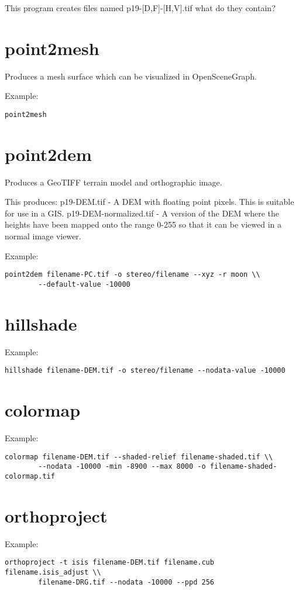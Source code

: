 This program creates files named p19-[D,F]-[H,V].tif what do they contain?

\section{point2mesh}
\label{point2mesh}

Produces a mesh surface which can be visualized in OpenSceneGraph.

Example:
\begin{verbatim}
point2mesh
\end{verbatim}

\section{point2dem}
\label{point2dem}

Produces a GeoTIFF terrain model and orthographic image.

This produces: 
	p19-DEM.tif - A DEM with floating point pixels. This is suitable for use in a GIS.
	p19-DEM-normalized.tif - A version of the DEM where the heights have been mapped onto the range 0-255 so that it can be viewed in a normal image viewer.

Example:
\begin{verbatim}
point2dem filename-PC.tif -o stereo/filename --xyz -r moon \\
        --default-value -10000
\end{verbatim}

\section{hillshade}
\label{hillshade}

Example:
\begin{verbatim}
hillshade filename-DEM.tif -o stereo/filename --nodata-value -10000
\end{verbatim}

\section{colormap}
\label{colormap}

Example:
\begin{verbatim}
colormap filename-DEM.tif --shaded-relief filename-shaded.tif \\
        --nodata -10000 -min -8900 --max 8000 -o filename-shaded-colormap.tif
\end{verbatim}

\section{orthoproject}
\label{orthoproject}

Example:
\begin{verbatim}
orthoproject -t isis filename-DEM.tif filename.cub filename.isis_adjust \\
        filename-DRG.tif --nodata -10000 --ppd 256
\end{verbatim}

